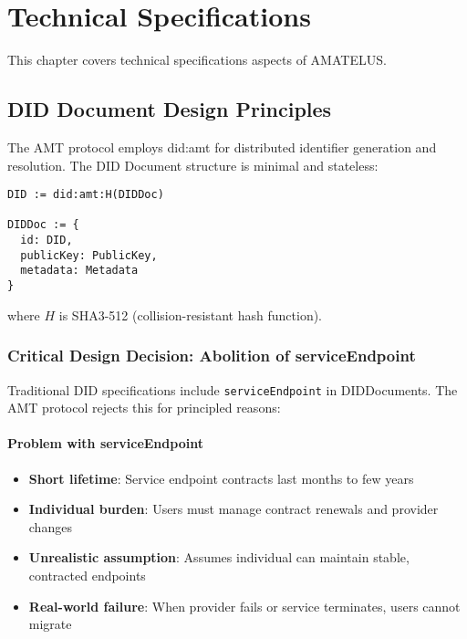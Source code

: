 \chapter{Technical Specifications}


\begin{definition}
  \label{def:tech-chapter}
  This chapter covers technical specifications aspects of AMATELUS.
  \leanok
\end{definition}
\section{DID Document Design Principles}

The AMT protocol employs did:amt for distributed identifier generation and resolution. The DID Document structure is minimal and stateless:

\begin{verbatim}
DID := did:amt:H(DIDDoc)

DIDDoc := {
  id: DID,
  publicKey: PublicKey,
  metadata: Metadata
}
\end{verbatim}

where $H$ is SHA3-512 (collision-resistant hash function).

\subsection{Critical Design Decision: Abolition of serviceEndpoint}

Traditional DID specifications include \texttt{serviceEndpoint} in DIDDocuments. The AMT protocol rejects this for principled reasons:

\subsubsection{Problem with serviceEndpoint}

\begin{itemize}
  \item \textbf{Short lifetime}: Service endpoint contracts last months to few years
  \item \textbf{Individual burden}: Users must manage contract renewals and provider changes
  \item \textbf{Unrealistic assumption}: Assumes individual can maintain stable, contracted endpoints
  \item \textbf{Real-world failure}: When provider fails or service terminates, users cannot migrate
\end{itemize}

